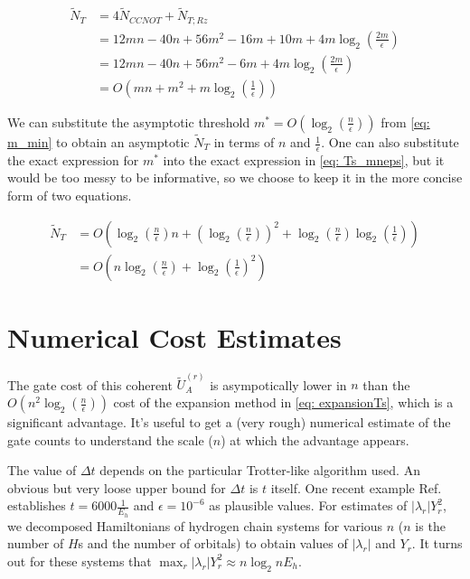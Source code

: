 \begin{equation}
    \begin{split}
        \tilde{N}_{T} &= 4\tilde{N}_{CCNOT} + \tilde{N}_{T; Rz} \\
        &= 12mn - 40n + 56m^2 - 16m + 10m + 4m\log_2(\frac{2m}{\epsilon}) \\
        &= 12mn - 40n + 56m^2 - 6m + 4m\log_2(\frac{2m}{\epsilon}) \\
        &= O(mn + m^2 + m\log_2(\frac{1}{\epsilon})) \label{eq: Ts_mneps}
    \end{split}
\end{equation}

We can substitute the asymptotic threshold $m^* = O(\log_2(\frac{n}{\epsilon}))$ from \eqref{eq: m_min} to obtain an asymptotic $\tilde{N}_{T}$ in terms of $n$ and $\frac{1}{\epsilon}$. One can also substitute the exact expression for $m^*$ into the exact expression in \eqref{eq: Ts_mneps}, but it would be too messy to be informative, so we choose to keep it in the more concise form of two equations.

\begin{equation}
    \begin{split}
        \tilde{N}_{T} &= O(\log_2(\frac{n}{\epsilon})n + (\log_2(\frac{n}{\epsilon}))^2 + \log_2(\frac{n}{\epsilon})\log_2(\frac{1}{\epsilon})) \\
        &= O(n\log_2(\frac{n}{\epsilon}) + \log_2(\frac{1}{\epsilon})^2) \label{eq: Ts_neps}
    \end{split}
\end{equation}

\section{Numerical Cost Estimates}

The gate cost of this coherent $\tilde{U}_A^{(r)}$ is asympotically lower in $n$ than the $O(n^2\log_2(\frac{n}{\epsilon}))$ cost of the expansion method in \eqref{eq: expansionTs}, which is a significant advantage. It's useful to get a (very rough) numerical estimate of the gate counts to understand the scale ($n$) at which the advantage appears.

The value of $\Delta t$ depends on the particular Trotter-like algorithm used. An obvious but very loose upper bound for $\Delta t$ is $t$ itself. One recent example Ref. \cite{Gate_Count} establishes $t = 6000 \frac{1}{E_h}$ and $\epsilon = 10^{-6}$ as plausible values. For estimates of $|\lambda_r|Y_r^2$, we decomposed Hamiltonians of hydrogen chain systems for various $n$ ($n$ is the number of $H$s and the number of orbitals) to obtain values of $|\lambda_r|$ and $Y_r$. It turns out for these systems that $\max_r |\lambda_r|Y_r^2 \approx n\log_2{n} E_h$.

